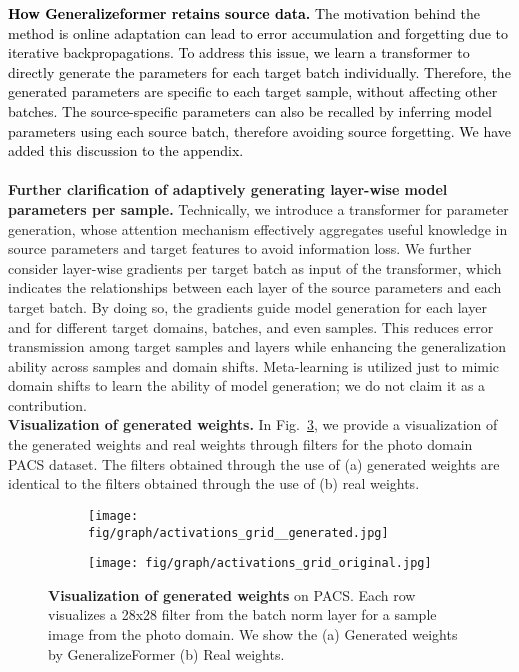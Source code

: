 \noindent \textcolor{black}{{\textbf{How Generalizeformer retains source data.}} \textcolor{black}{The motivation behind the method is online adaptation can lead to error accumulation and forgetting due to iterative backpropagations. To address this issue, we learn a transformer to directly generate the parameters for each target batch individually. Therefore, the generated parameters are specific to each target sample, without affecting other batches. The source-specific parameters can also be recalled by inferring model parameters using each source batch, therefore avoiding source forgetting. We have added this discussion to the appendix.}}  \\ \\
\textbf{Further clarification of adaptively generating layer-wise model parameters per sample.  }
Technically, we introduce a transformer for parameter generation, whose attention mechanism effectively aggregates useful knowledge in source parameters and target features to avoid information loss.
We further consider layer-wise gradients per target batch as input of the transformer, which indicates the relationships between each layer of the source parameters and each target batch. By doing so, the gradients guide model generation for each layer and for different target domains, batches, and even samples.
This reduces error transmission among target samples and layers while enhancing the generalization ability across samples and domain shifts. Meta-learning is utilized just to mimic domain shifts to learn the ability of model generation; we do not claim it as a contribution.\\

\noindent \textbf{Visualization of generated weights.}
In Fig.~\ref{fig:generated_weights}, we provide a visualization of the generated weights and real weights through filters for the photo domain PACS dataset. The filters obtained through the use of (a) generated weights are identical to the filters obtained through the use of (b) real weights. \\


\begin{figure}[t]
    \centering
    \begin{subfigure}[b]{0.45\linewidth}
        \texttt{[image: fig/graph/activations\_grid\_\_generated.jpg]}
        \caption{}
        \label{fig:weightsgen}
    \end{subfigure}
    \hfill
    \begin{subfigure}[b]{0.45\linewidth}
        \texttt{[image: fig/graph/activations\_grid\_original.jpg]}
        \caption{}
        \label{fig:realweights}
    \end{subfigure}
    \caption{{\textbf{Visualization of generated weights} on PACS. Each row visualizes a 28x28 filter from the batch norm layer for a sample image from the photo domain. We show the (a) Generated weights by GeneralizeFormer (b) Real weights.}}
    \vspace{-6mm}
    \label{fig:generated_weights}
\end{figure}


